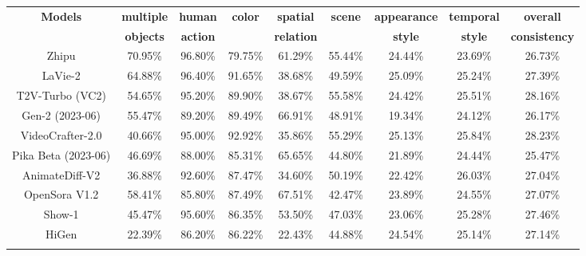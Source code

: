 \documentclass{article}
\begin{document}
\begin{table}[ht!]
\begin{center}
{\begin{tabular}{ccccccccc}
\multirow{2}{*}{\textbf{Models} }  & \textbf{multiple}  & \textbf{human} &\multirow{2}{*}{\textbf{color}} &\textbf{spatial} &\multirow{2}{*}{\textbf{scene}} &\textbf{appearance} &\textbf{temporal} &\textbf{overall} \\
    & \textbf{objects}& \textbf{action}& & \textbf{relation} & & \textbf{style}&\textbf{style} & \textbf{consistency}
\\ \hline 
        Zhipu & 70.95\% & 96.80\% & 79.75\% & 61.29\% & 55.44\% & 24.44\% & 23.69\% & 26.73\%  \\ 
        LaVie-2 & 64.88\% & 96.40\% & 91.65\% & 38.68\% & 49.59\% & 25.09\% & 25.24\% & 27.39\%  \\ 
        T2V-Turbo (VC2) & 54.65\% & 95.20\% & 89.90\% & 38.67\% & 55.58\% & 24.42\% & 25.51\% & 28.16\%  \\
        Gen-2 (2023-06) & 55.47\% & 89.20\% & 89.49\% & 66.91\% & 48.91\% & 19.34\% & 24.12\% & 26.17\%  \\ 
        VideoCrafter-2.0 & 40.66\% & 95.00\% & 92.92\% & 35.86\% & 55.29\% & 25.13\% & 25.84\% & 28.23\%  \\
        Pika Beta (2023-06) & 46.69\% & 88.00\% & 85.31\% & 65.65\% & 44.80\% & 21.89\% & 24.44\% & 25.47\%  \\ 
        AnimateDiff-V2 & 36.88\% & 92.60\% & 87.47\% & 34.60\% & 50.19\% & 22.42\% & 26.03\% & 27.04\%  \\ 
        OpenSora V1.2 & 58.41\% & 85.80\% & 87.49\% & 67.51\% & 42.47\% & 23.89\% & 24.55\% & 27.07\%  \\ 
        Show-1 & 45.47\% & 95.60\% & 86.35\% & 53.50\% & 47.03\% & 23.06\% & 25.28\% & 27.46\%  \\ 
        HiGen & 22.39\% & 86.20\% & 86.22\% & 22.43\% & 44.88\% & 24.54\% & 25.14\% & 27.14\% \\ \hline

\hline \\
\end{tabular}


}
\end{center}
\end{table}
\end{document}

